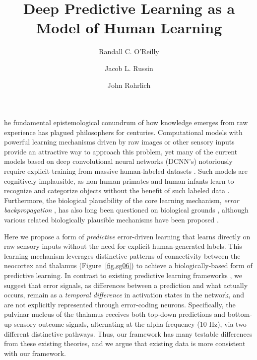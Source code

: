 \documentclass[12pt,twoside,lineno]{pnas-new}  %
\title{ Deep Predictive Learning as a Model of Human Learning }
\author[a,1]{Randall C. O'Reilly}
\author[a]{Jacob L. Russin}
\author[a]{John Rohrlich}
\affil[a]{Department of Psychology, Computer Science, and Center for Neuroscience, University of California Davis}
\begin{document}

\maketitle 
\thispagestyle{firststyle}

he fundamental epistemological conundrum of how knowledge emerges from raw experience has plagued philosophers for centuries.  Computational models with powerful learning mechanisms driven by raw images or other sensory inputs provide an attractive way to approach this problem, yet many of the current models based on deep convolutional neural networks (DCNN's) notoriously require explicit training from massive human-labeled datasets \cite{KrizhevskySutskeverHinton12,LeCunBengioHinton15,Schmidhuber15a}.  Such models are cognitively implausible, as non-human primates and human infants learn to recognize and categorize objects without the benefit of such labeled data \cite{LakeUllmanTenenbaumEtAl17}.  Furthermore, the biological plausibility of the core learning mechanism, {\em error backpropagation} \cite{RumelhartHintonWilliams86}, has also long been questioned on biological grounds \cite{Crick89}, although various related biologically plausible mechanisms have been proposed \cite{OReilly96,XieSeung03,BengioMesnardFischerEtAl17}.


Here we propose a form of {\em predictive} error-driven learning \cite{Elman90,ElmanBatesKarmiloff-SmithEtAl96} that learns directly on raw sensory inputs without the need for explicit human-generated labels.  This learning mechanism leverages distinctive patterns of connectivity between the neocortex and thalamus \cite{ShermanGuillery06} (Figure~\ref{fig.sg06}) to achieve a biologically-based form of predictive learning.  In contrast to existing predictive learning frameworks \cite{Mumford92,RaoBallard99,KawatoHayakawaInui93,Friston05}, we suggest that error signals, as differences between a prediction and what actually occurs, remain as a {\em temporal difference} in activation states in the network, and are not explicitly represented through error-coding neurons.  Specifically, the pulvinar nucleus of the thalamus receives both top-down predictions and bottom-up sensory outcome signals, alternating at the alpha frequency (10 Hz), via two different distinctive pathways.  Thus, our framework has many testable differences from these existing theories, and we argue that existing data is more consistent with our framework.
\end{document}
